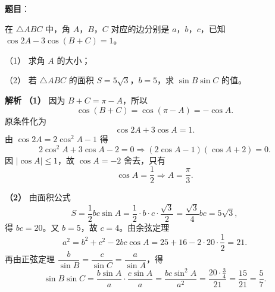 \begin{answer}

\textbf{题目}：

在 $\triangle ABC$ 中，角 $A$，$B$，$C$ 对应的边分别是 $a$，$b$，$c$，已知 $\cos2A-3\cos(B+C)=1$。

（1） 求角 $A$ 的大小；

（2） 若 $\triangle ABC$ 的面积 $S=5\sqrt3$，$b=5$，求 $\sin B\sin C$ 的值。

\textbf{解析}
\textbf{（1）} 因为 $B+C=\pi-A$，所以
\nopagebreak[4]
\[\cos(B+C)=\cos(\pi-A)=-\cos A.\]
原条件化为
\nopagebreak[4]
\[\cos2A+3\cos A=1.\]
由 $\cos2A=2\cos^2A-1$ 得
\nopagebreak[4]
\[2\cos^2A+3\cos A-2=0
\Longrightarrow(2\cos A-1)(\cos A+2)=0.\]
因 $|\cos A|\leqslant1$，故 $\cos A=-2$ 舍去，只有
\nopagebreak[4]
\[\cos A=\frac12\Longrightarrow A=\frac\pi3.\]

\textbf{（2）} 由面积公式
\nopagebreak[4]
\[S=\frac12bc\sin A=\frac12\cdot b\cdot c\cdot\frac{\sqrt3}{2}
=\frac{\sqrt3}{4}bc=5\sqrt3,\]
得 $bc=20$。又 $b=5$，故 $c=4$。由余弦定理
\nopagebreak[4]
\[a^2=b^2+c^2-2bc\cos A=25+16-2\cdot20\cdot\frac12=21.\]
再由正弦定理 $\dfrac{b}{\sin B}=\dfrac{c}{\sin C}=\dfrac{a}{\sin A}$，得
\nopagebreak[4]
\[\sin B\sin C=\frac{b\sin A}{a}\cdot\frac{c\sin A}{a}
=\frac{bc\sin^2A}{a^2}
=\frac{20\cdot\frac34}{21}=\frac{15}{21}=\frac57.\]



\end{answer}
